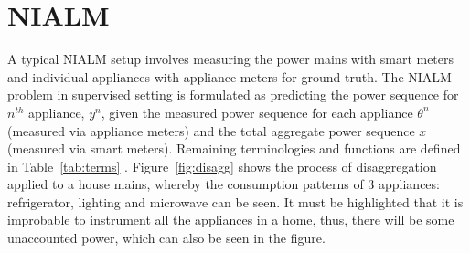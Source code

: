 \documentclass[conference]{IEEEtran}
\newcommand{\figref}[1]{Figure~\ref{#1}}
\newcommand{\tabref}[1]{Table~\ref{#1}}
\begin{document}



\section{NIALM}
\noindent A typical NIALM setup involves measuring the power mains with smart meters and individual appliances with appliance meters for ground truth. The NIALM problem in supervised setting is formulated as predicting the power sequence for $n^{th}$ appliance, $y^n$, given the measured power sequence for each appliance $\theta^n$ (measured via appliance meters) and the total aggregate power sequence $x$ (measured via smart meters). Remaining terminologies and functions are defined in \tabref{tab:terms} \cite{redd,parson2012_aaai,hart}. \figref{fig:disagg} shows the process of disaggregation applied to a house mains, whereby the consumption patterns of 3 appliances: refrigerator, lighting and microwave can be seen. It must be highlighted that it is improbable to instrument all the appliances in a home, thus, there will be some unaccounted power, which can also be seen in the figure.
\end{document}
